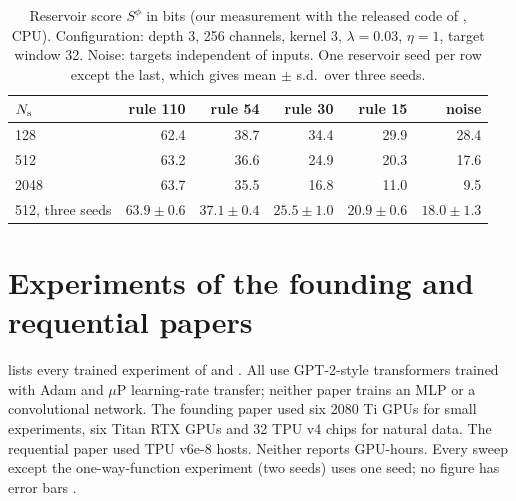 \documentclass[11pt]{article}
\theoremstyle{tight}
\begin{document}
\begin{table}[!htb]
\centering\small
\caption{Reservoir score $S^\phi$ in bits (our measurement with the released code of
\citealp{learnablenoveltycode}, CPU). Configuration: depth 3, 256 channels, kernel 3,
$\lambda=0.03$, $\eta=1$, target window 32. Noise: targets independent of inputs. One reservoir seed
per row except the last, which gives mean $\pm$ s.d.\ over three seeds.}\label{tab:zl}
\begin{tabular}{@{}lrrrrr@{}}
\toprule
$N_{\rm s}$ & rule 110 & rule 54 & rule 30 & rule 15 & noise \\
\midrule
128  & 62.4 & 38.7 & 34.4 & 29.9 & 28.4 \\
512  & 63.2 & 36.6 & 24.9 & 20.3 & 17.6 \\
2048 & 63.7 & 35.5 & 16.8 & 11.0 & 9.5 \\
512, three seeds & $63.9\pm0.6$ & $37.1\pm0.4$ & $25.5\pm1.0$ & $20.9\pm0.6$ & $18.0\pm1.3$ \\
\bottomrule
\end{tabular}
\end{table}

\section{Experiments of the founding and requential papers}\label{sec:exp}
 lists every trained experiment of \citet{finzi2026epiplexity} and
\citet{qiu2026requential}. All use GPT-2-style transformers trained with Adam and $\mu$P
learning-rate transfer; neither paper trains an MLP or a convolutional network. The founding paper
used six 2080 Ti GPUs for small experiments, six Titan RTX GPUs and 32 TPU v4 chips for natural data.
The requential paper used TPU v6e-8 hosts. Neither reports GPU-hours. Every sweep except the
one-way-function experiment (two seeds) uses one seed; no figure has error bars
\citep{epiplexitycode,requentialcode}.
\end{document}
